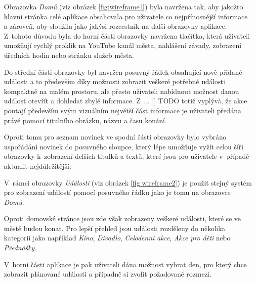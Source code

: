 \pagebreak
\begin{minipage}[t]{0.45\textwidth}
  Obrazovka \textit{Domů} (viz obrázek \ref{fig:wireframe1}) byla navržena tak, aby jakožto hlavní stránka celé aplikace obsahovala pro uživatele
  co nejpřínosnější informace a zároveň, aby sloužila jako jakýsi rozcestník na další obrazovky aplikace. Z~tohoto důvodu byla do horní části obrazovky
  navržena tlačítka, která uživateli umožňují rychlý proklik na YouTube kanál města, nahlášení závady, zobrazení úředních hodin nebo stránku služeb města.
  

  Do střední části obrazovky byl navržen posuvný řádek obsahující nově přidané události a to především díky možnosti zobrazit
  veškeré potřebné události kompaktně na malém prostoru, ale přesto uživateli nabídnout možnost danou událost otevřít a dohledat zbylé informace.
  Z~... \ref{}  TODO totiž vyplývá, že akce poutají především svým vizuálním největší část informace je uživateli předána právě pomocí titulního obrázku, názvu
  a času konání.
  
  Oproti tomu pro seznam novinek ve spodní části obrazovky bylo vybráno uspořádání novinek do posuvného sloupce, který lépe umožňuje 
  vyžít celou šíři obrazovky k~zobrazení delších titulků a textů, které jsou pro uživatele v~případě aktualit nejdůležitější.
  
  
  
  
  \bigskip
  V~rámci obrazovky \textit{Události} (viz obrázek \ref{fig:wireframe2}) je použit stejný systém pro zobrazení událostí pomocí posuvného řádku 
  jako je tomu na obrazovce \textit{Domů}.
  
  Oproti domovské stránce jsou zde však zobrazeny veškeré události, které se ve městě budou konat. Pro lepší přehled jsou události rozděleny 
  do několika kategorií jako například \textit{Kino}, \textit{Divadlo}, \textit{Celodenní akce}, \textit{Akce pro děti} nebo \textit{Přednášky}.
  
  V~horní části aplikace je pak uživateli dána možnost vybrat den, pro který chce zobrazit plánované události a případně si zvolit požadované rozmezí.


\end{minipage}
